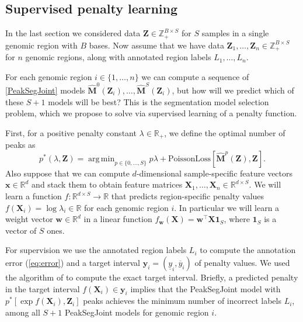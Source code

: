 \documentclass{article} %
\DeclareMathOperator*{\argmin}{arg\,min}
\newcommand{\RR}{\mathbb R}
\newcommand{\ZZ}{\mathbb Z}
\begin{document}
\subsection{Supervised penalty learning}

In the last section we considered data $\mathbf Z\in\ZZ_+^{B\times S}$
for $S$ samples in a single genomic region with $B$ bases. Now assume
that we have data $\mathbf Z_1,\dots, \mathbf Z_n\in\ZZ_+^{B\times S}$
for $n$ genomic regions, along with annotated region labels
$L_1,\dots, L_n$. 

For each genomic region $i\in\{1,\dots,n\}$ we can compute a sequence
of \ref{PeakSegJoint} models $\mathbf{\hat M}^0(\mathbf Z_i),\dots,
\mathbf{\hat M}^S(\mathbf Z_i)$, but how will we predict which of
these $S+1$ models will be best?
This is the segmentation model selection problem, which we propose to
solve via supervised learning of a penalty function.

First, for a positive penalty constant $\lambda\in\RR_+$, we define
the optimal number of peaks as
\begin{equation}
  \label{eq:optimal_segments}
  p^*(\lambda, \mathbf Z) =
  \argmin_{p\in\{0, \dots, S\}}
  p \lambda + 
  \text{PoissonLoss}\left[
    \mathbf{\hat M}^p(\mathbf Z),
    \mathbf Z
  \right].
\end{equation}
Also suppose that we can compute $d$-dimensional sample-specific
feature vectors $\mathbf x\in\RR^d$ and stack them to obtain feature
matrices $\mathbf X_1,\dots, \mathbf X_n\in\RR^{d\times S}$. We will
learn a function $f:\RR^{d\times S}\rightarrow\RR$ that predicts
region-specific penalty values $f(\mathbf X_i) = \log \lambda_i\in\RR$
for each genomic region $i$. In particular we will learn a weight
vector $\mathbf w\in\RR^d$ in a linear function $f_{\mathbf w}(\mathbf X) =
\mathbf w^\intercal \mathbf X \mathbf 1_S$, where $\mathbf 1_S$ is a
vector of $S$ ones.

For supervision we use the annotated region labels $L_i$ to compute
the annotation error (\ref{eq:error}) and a target interval $\mathbf
y_i = (
    \underline y_i, \overline y_i
)$ of penalty values. We used the algorithm of
\citet{HOCKING-penalties} to compute the exact target interval.
Briefly,
a predicted penalty in the target interval $f(\mathbf
X_i)\in\mathbf y_i$ implies that the
PeakSegJoint model with $p^*\left[\exp f(\mathbf X_i), \mathbf
  Z_i\right]$ peaks achieves the minimum number of incorrect labels
$L_i$, among all $S+1$ PeakSegJoint models for genomic region $i$.
\end{document}

